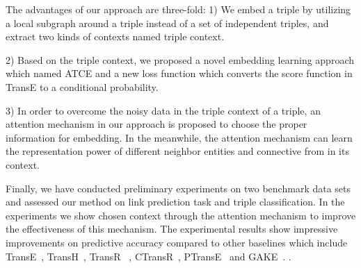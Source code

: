 The advantages of our approach are three-fold:
1) We embed a triple by utilizing a local subgraph around a triple instead of a set of independent triples, and extract two kinds of contexts named triple context.

2) Based on the triple context, we proposed a novel embedding learning approach which named ATCE and a new loss function which converts the score function in TransE to a conditional probability.

3) In order to overcome the noisy data in the triple context of a triple, an attention mechanism in our approach is proposed to choose the proper information for embedding. In the meanwhile, the attention mechanism can learn the representation power of different neighbor entities and connective from in its context.

Finally, we have conducted preliminary experiments on two benchmark data sets and assessed our method on link prediction task and triple classification. In the experiments we show chosen context through the attention mechanism to improve the effectiveness of this mechanism. The experimental results show impressive improvements on predictive accuracy compared to other baselines which include TransE~\cite{BordesUGWY13}, TransH~\cite{WangZFC14}, TransR~\cite{LinLSLZ15} , CTransR~\cite{LinLSLZ15}, PTransE~\cite{LinLLSRL15} and GAKE~\cite{FengHYZ16}. .

